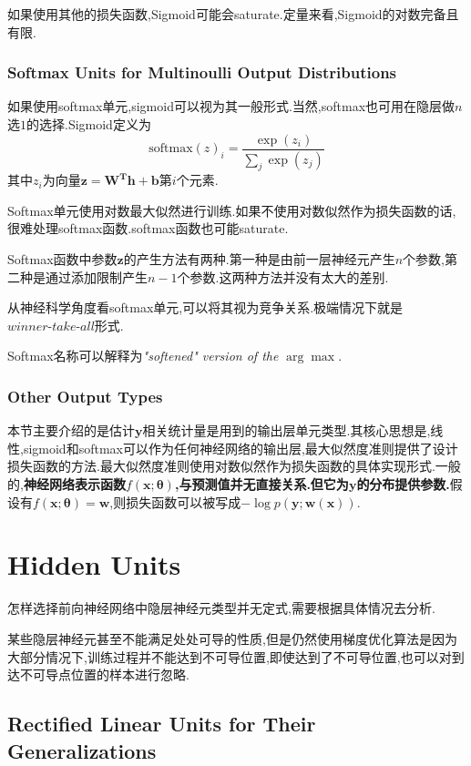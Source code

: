 如果使用其他的损失函数,Sigmoid可能会saturate.定量来看,Sigmoid的对数完备且有限.

\subsubsection{Softmax Units for Multinoulli Output Distributions}

如果使用softmax单元,sigmoid可以视为其一般形式.当然,softmax也可用在隐层做$n$选$1$的选择.Sigmoid定义为
\begin{equation}
\text{softmax}(z)_i=\frac{\exp(z_i)}{\sum_j\exp(z_j)}
\end{equation}
其中$z_i$为向量$\bm{z=W^Th+b}$第$i$个元素.

Softmax单元使用对数最大似然进行训练.如果不使用对数似然作为损失函数的话,很难处理softmax函数.softmax函数也可能saturate.

Softmax函数中参数$\bm z$的产生方法有两种.第一种是由前一层神经元产生$n$个参数,第二种是通过添加限制产生$n-1$个参数.这两种方法并没有太大的差别.

从神经科学角度看softmax单元,可以将其视为竞争关系.极端情况下就是$\textit{winner-take-all}$形式.

Softmax名称可以解释为\textit{"softened" version of the} $\arg \max$.

\subsubsection{Other Output Types}

本节主要介绍的是估计$\bm y$相关统计量是用到的输出层单元类型.其核心思想是,线性,sigmoid和softmax可以作为任何神经网络的输出层,最大似然度准则提供了设计损失函数的方法.最大似然度准则使用对数似然作为损失函数的具体实现形式.一般的,\textbf{神经网络表示函数$f(\bm x;{\bm\theta})$,与预测值并无直接关系.但它为$\bm y$的分布提供参数.}假设有$f(\bm x;{\bm\theta})=\bm w$,则损失函数可以被写成$-\log p(\bm y;\bm{w(x)})$.

\section{Hidden Units}

怎样选择前向神经网络中隐层神经元类型并无定式,需要根据具体情况去分析.

某些隐层神经元甚至不能满足处处可导的性质,但是仍然使用梯度优化算法是因为大部分情况下,训练过程并不能达到不可导位置,即使达到了不可导位置,也可以对到达不可导点位置的样本进行忽略.

\subsection{Rectified Linear Units for Their Generalizations}


